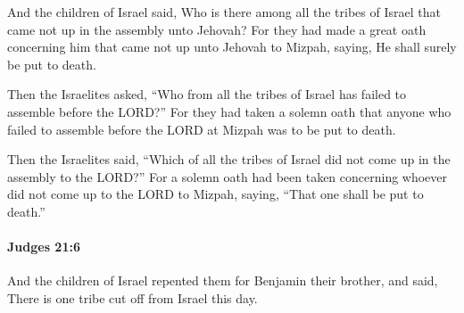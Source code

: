 			\begin{versebox}
					\item[BHS] 
					\item[ASV] And the children of Israel said, Who is there among all the tribes of Israel that came not up in the assembly unto Jehovah? For they had made a great oath concerning him that came not up unto Jehovah to Mizpah, saying, He shall surely be put to death.
					\item[NIV] Then the Israelites asked, “Who from all the tribes of Israel has failed to assemble before the LORD?” For they had taken a solemn oath that anyone who failed to assemble before the LORD at Mizpah was to be put to death.
					\item[NRSV] Then the Israelites said, “Which of all the tribes of Israel did not come up in the assembly to the LORD?” For a solemn oath had been taken concerning whoever did not come up to the LORD to Mizpah, saying, “That one shall be put to death.”
			\end{versebox}

		\paragraph{Judges 21:6} %
			\label{JUDGES-21-6}

			And the children of Israel repented them for Benjamin their brother, and said, There is one tribe cut off from Israel this day.

